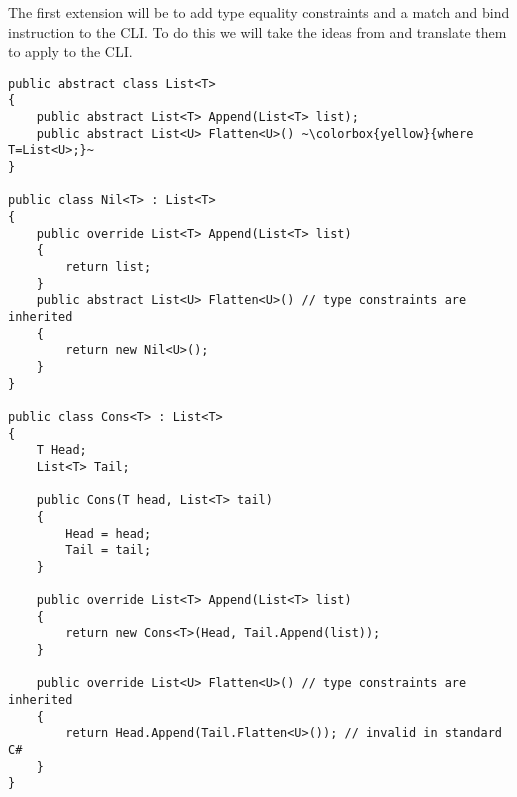 The first extension will be to add type equality constraints and a
match and bind instruction to the CLI. To do this we will take the
ideas from \cite{gadts} and translate them to apply to the CLI.

\begin{lstlisting}[caption={Type equality constraints in extended C\#\protect \\
Extension of listing \ref{lis:csharp gadt}},escapechar={~},keywordstyle={\color{blue}},language=sharpc]
public abstract class List<T>
{
	public abstract List<T> Append(List<T> list);
	public abstract List<U> Flatten<U>() ~\colorbox{yellow}{where T=List<U>;}~
}

public class Nil<T> : List<T>
{
	public override List<T> Append(List<T> list)
	{
		return list;
	}
	public abstract List<U> Flatten<U>() // type constraints are inherited
	{
		return new Nil<U>();
	}
}

public class Cons<T> : List<T>
{
	T Head;
	List<T> Tail;

	public Cons(T head, List<T> tail) 
	{
		Head = head;
		Tail = tail;
	}

	public override List<T> Append(List<T> list)
	{
		return new Cons<T>(Head, Tail.Append(list));
	}

	public override List<U> Flatten<U>() // type constraints are inherited
	{
		return Head.Append(Tail.Flatten<U>()); // invalid in standard C#
	}
}
\end{lstlisting}


